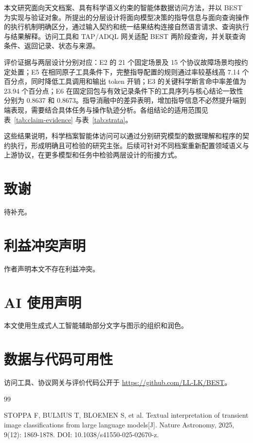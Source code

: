 \documentclass{dcfp}
\begin{document}
\begin{PaperBody}
本文研究面向天文档案、具有科学语义约束的智能体数据访问方法，并以 BEST 为实现与验证对象。所提出的分层设计将面向模型决策的指导信息与面向查询操作的执行机制明确区分，通过输入契约和统一结果结构连接自然语言请求、查询执行与结果解释。访问工具和 TAP/ADQL 网关适配 BEST 两阶段查询，并关联查询条件、返回记录、状态与来源。

评价证据与两层设计分别对应：E2 的 21 个固定场景及 15 个协议故障场景均按约定处置；E5 在相同原子工具条件下，完整指导配置的规则通过率较基线高 7.14 个百分点，同时降低工具调用和输出 token 开销；E3 的关键科学断言命中率差值为 23.94 个百分点；E6 在固定回包与有效记录条件下的工具序列与核心结论一致性分别为 0.8637 和 0.8673。指导消融中的差异表明，增加指导信息不必然提升端到端表现，需要结合具体任务与操作轨迹分析。各组结论的适用范围见表~\ref{tab:claim-evidence} 与表~\ref{tab:strata}。

这些结果说明，科学档案智能体访问可以通过分别研究模型的数据理解和程序的契约执行，形成明确且可检验的研究主张。后续可针对不同档案重新配置领域语义与上游协议，在更多模型和任务中检验两层设计的衔接方式。

\section*{致谢}

待补充。

\section*{利益冲突声明}

作者声明本文不存在利益冲突。

\section*{AI 使用声明}

本文使用生成式人工智能辅助部分文字与图示的组织和润色。

\section*{数据与代码可用性}

访问工具、协议网关与评价代码公开于 \url{https://github.com/LL-LK/BEST}。

\begin{thebibliography}{99}
\RaggedRight

 STOPPA F, BULMUS T, BLOEMEN S, et al. Textual interpretation of transient image classifications from large language models[J]. Nature Astronomy, 2025, 9(12): 1869-1878. DOI: 10.1038/s41550-025-02670-z.


\end{thebibliography}
\end{PaperBody}
\end{document}
